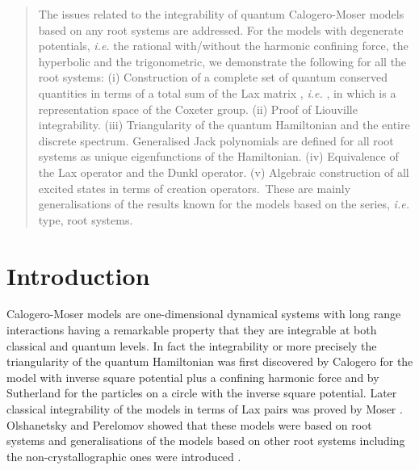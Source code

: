 \documentclass[a4paper,12pt]{article}
\begin{document}
\begin{abstract}
The issues related to the integrability of quantum Calogero-Moser models
based on any root systems are addressed.
For the models with degenerate potentials, {\em i.e.}
the rational with/without the harmonic confining force,
the hyperbolic and the trigonometric,
we demonstrate the following for all the root systems:
(i) Construction of a complete set of quantum conserved quantities in terms
of a total sum of the Lax matrix \coordHE{}, {\em i.e.}
\coordHE{}, in which
\coordHE{} is a representation
space of the Coxeter group. (ii) Proof of Liouville integrability.
(iii) Triangularity of the quantum Hamiltonian and the entire
discrete spectrum. Generalised Jack polynomials are defined for all root
systems as unique eigenfunctions of the Hamiltonian. (iv) Equivalence of
the Lax operator and the Dunkl operator. (v) Algebraic construction of all
excited states in terms of creation operators.\  These are mainly
generalisations of the results known for the models based on the
\coordHE{} series, {\em i.e.} \coordHE{} type, root systems.
\end{abstract}
\bigskip
\bigskip
\bigskip

\section{Introduction}
\label{intro}
\setcounter{equation}{0}



Calogero-Moser models are one-dimensional dynamical systems with long
range interactions having a remarkable property that they are integrable
at both classical and quantum levels.
In fact the integrability or more precisely the triangularity of
the quantum Hamiltonian was
first discovered by Calogero \cite{Cal} for the model with inverse square
potential plus a confining harmonic force and by Sutherland \cite{Sut}
for the particles on a circle with the inverse square potential.
Later classical integrability of the models in terms of Lax pairs
was proved by Moser \cite{CalMo}. Olshanetsky and Perelomov \cite{OP1}
showed that these models were based on \coordHE{} root systems and
generalisations of the models based on other root systems including the
non-crystallographic ones were introduced \cite{OP2}.
\end{document}
